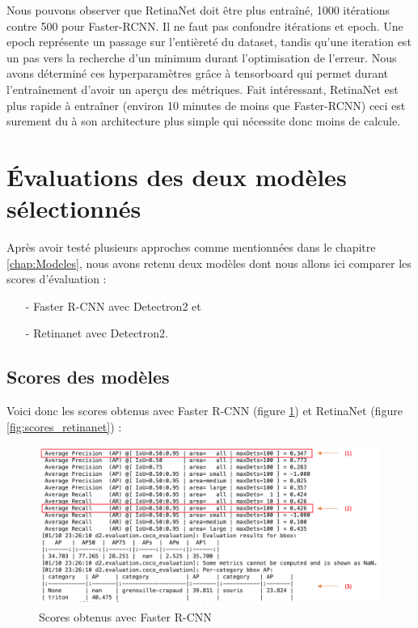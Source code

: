 Nous pouvons observer que RetinaNet doit être plus entraîné, 1000 itérations contre 500 pour Faster-RCNN. Il ne faut pas confondre itérations et epoch. Une epoch représente un passage sur l'entièreté du dataset, tandis qu'une iteration est un pas vers la recherche d'un minimum durant l'optimisation de l'erreur. Nous avons déterminé ces hyperparamètres grâce à tensorboard qui permet durant l'entraînement d'avoir un aperçu des métriques. Fait intéressant, RetinaNet est plus rapide à entraîner (environ 10 minutes de moins que Faster-RCNN) ceci est surement du à son architecture plus simple qui nécessite donc moins de calcule.


\section{Évaluations des deux modèles sélectionnés}\label{anal:evaluation}

Après avoir testé plusieurs approches comme mentionnées dans le chapitre \ref{chap:Modeles}, nous avons retenu deux modèles dont nous allons ici comparer les scores d'évaluation :

\begin{itemize}
    \item[-] Faster R-CNN avec Detectron2 et
    \item[-] Retinanet avec Detectron2.
\end{itemize}

\subsection{Scores des modèles}

Voici donc les scores obtenus avec Faster R-CNN (figure \ref{fig:scores_fasterRcnn}) et RetinaNet (figure \ref{fig:scores_retinanet}) :

\begin{figure}[H]
    \centering
    \includegraphics[width=\textwidth]{images/eval_FasterRCNN_resume_annote.png}
    \caption{Scores obtenus avec Faster R-CNN}
    \label{fig:scores_fasterRcnn}
\end{figure}

